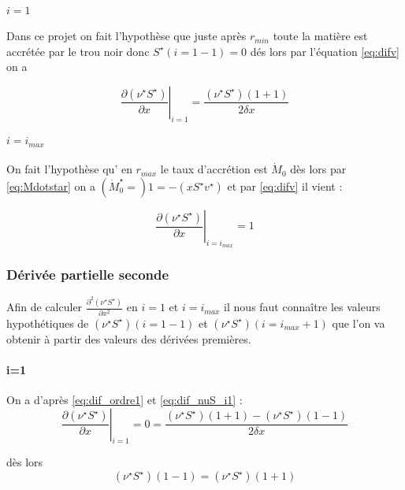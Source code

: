 \paragraph{$i=1$}
Dans ce projet on fait l'hypothèse que juste après $r_{min}$ toute la matière est accrétée par le trou noir donc $S^{\star}(i=1-1)=0$ dés lors par l'équation \eqref{eq:difv} on a

\begin{equation}
  \left. \frac{\partial (\nu^{\star} S^{\star})}{\partial x}\right|_{i=1}=\frac{(\nu^\star S^{\star})(1+1)}{2 \delta x}\label{eq:dif_nuS_i1}
\end{equation}

\paragraph{$i=i_{max}$}
On fait l'hypothèse qu' en $r_{max}$ le taux d'accrétion est $\dot{M}_0$ dès lors par \eqref{eq:Mdotstar} on a $(\dot{M}^{\star}_0=)1 = -(x S^{\star}v^{\star})$ et par \eqref{eq:difv} il vient :

\begin{equation}
  \left. \frac{\partial (\nu^{\star} S^{\star})}{\partial x}\right|_{i=i_{max}}=1\label{eq:dif_nuS_imax}
\end{equation}

\subsubsection{Dérivée partielle seconde}
Afin de calculer $\frac{\partial^2(\nu^{\star} S^{\star})} {\partial x^2}$ en $i=1$ et $i=i_{max}$ il nous faut connaître les valeurs hypothétiques de $(\nu^{\star} S^{\star})(i=1-1)$ et $(\nu^{\star} S^{\star})(i=i_{max}+1)$ que l'on va obtenir à partir des valeurs des dérivées premières.

\paragraph{i=1}
On a d'après \eqref{eq:dif_ordre1} et \eqref{eq:dif_nuS_i1} :
\begin{equation}
  \left. \frac{\partial (\nu^{\star} S^{\star})}{\partial x}\right|_{i=1}=0=\frac{ (\nu^{\star} S^{\star})(1+1) - (\nu^{\star} S^{\star})(1-1)}{2\delta x}
\end{equation}

dès lors
\begin{equation}
  (\nu^{\star} S^{\star})(1-1)=(\nu^{\star} S^{\star})(1+1)
\end{equation}

